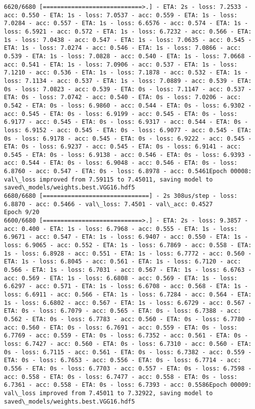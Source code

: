 \documentclass[11pt]{article}
\begin{document}
\begin{Verbatim}[commandchars=\\\{\}]
6620/6680 [============================>.] - ETA: 2s - loss: 7.2533 - acc: 0.550 - ETA: 1s - loss: 7.0537 - acc: 0.559 - ETA: 1s - loss: 7.0284 - acc: 0.557 - ETA: 1s - loss: 6.6576 - acc: 0.574 - ETA: 1s - loss: 6.5921 - acc: 0.572 - ETA: 1s - loss: 6.7232 - acc: 0.566 - ETA: 1s - loss: 7.0438 - acc: 0.547 - ETA: 1s - loss: 7.0635 - acc: 0.545 - ETA: 1s - loss: 7.0274 - acc: 0.546 - ETA: 1s - loss: 7.0866 - acc: 0.539 - ETA: 1s - loss: 7.0828 - acc: 0.540 - ETA: 1s - loss: 7.0668 - acc: 0.541 - ETA: 1s - loss: 7.0906 - acc: 0.537 - ETA: 1s - loss: 7.1210 - acc: 0.536 - ETA: 1s - loss: 7.1878 - acc: 0.532 - ETA: 1s - loss: 7.1134 - acc: 0.537 - ETA: 1s - loss: 7.0889 - acc: 0.539 - ETA: 0s - loss: 7.0823 - acc: 0.539 - ETA: 0s - loss: 7.1147 - acc: 0.537 - ETA: 0s - loss: 7.0742 - acc: 0.540 - ETA: 0s - loss: 7.0206 - acc: 0.542 - ETA: 0s - loss: 6.9860 - acc: 0.544 - ETA: 0s - loss: 6.9302 - acc: 0.545 - ETA: 0s - loss: 6.9199 - acc: 0.545 - ETA: 0s - loss: 6.9177 - acc: 0.545 - ETA: 0s - loss: 6.9317 - acc: 0.544 - ETA: 0s - loss: 6.9152 - acc: 0.545 - ETA: 0s - loss: 6.9077 - acc: 0.545 - ETA: 0s - loss: 6.9178 - acc: 0.545 - ETA: 0s - loss: 6.9222 - acc: 0.545 - ETA: 0s - loss: 6.9237 - acc: 0.545 - ETA: 0s - loss: 6.9141 - acc: 0.545 - ETA: 0s - loss: 6.9138 - acc: 0.546 - ETA: 0s - loss: 6.9393 - acc: 0.544 - ETA: 0s - loss: 6.9048 - acc: 0.546 - ETA: 0s - loss: 6.8760 - acc: 0.547 - ETA: 0s - loss: 6.8978 - acc: 0.5461Epoch 00008: val\_loss improved from 7.59115 to 7.45011, saving model to saved\_models/weights.best.VGG16.hdf5
6680/6680 [==============================] - 2s 308us/step - loss: 6.8870 - acc: 0.5466 - val\_loss: 7.4501 - val\_acc: 0.4527
Epoch 9/20
6600/6680 [============================>.] - ETA: 2s - loss: 9.3857 - acc: 0.400 - ETA: 1s - loss: 6.7968 - acc: 0.555 - ETA: 1s - loss: 6.9671 - acc: 0.547 - ETA: 1s - loss: 6.9407 - acc: 0.550 - ETA: 1s - loss: 6.9065 - acc: 0.552 - ETA: 1s - loss: 6.7869 - acc: 0.558 - ETA: 1s - loss: 6.8928 - acc: 0.551 - ETA: 1s - loss: 6.7772 - acc: 0.560 - ETA: 1s - loss: 6.8045 - acc: 0.561 - ETA: 1s - loss: 6.7120 - acc: 0.566 - ETA: 1s - loss: 6.7031 - acc: 0.567 - ETA: 1s - loss: 6.6763 - acc: 0.569 - ETA: 1s - loss: 6.6808 - acc: 0.569 - ETA: 1s - loss: 6.6297 - acc: 0.571 - ETA: 1s - loss: 6.6708 - acc: 0.568 - ETA: 1s - loss: 6.6911 - acc: 0.566 - ETA: 1s - loss: 6.7284 - acc: 0.564 - ETA: 1s - loss: 6.6802 - acc: 0.567 - ETA: 1s - loss: 6.6729 - acc: 0.567 - ETA: 0s - loss: 6.7079 - acc: 0.565 - ETA: 0s - loss: 6.7388 - acc: 0.562 - ETA: 0s - loss: 6.7783 - acc: 0.560 - ETA: 0s - loss: 6.7780 - acc: 0.560 - ETA: 0s - loss: 6.7691 - acc: 0.559 - ETA: 0s - loss: 6.7769 - acc: 0.559 - ETA: 0s - loss: 6.7352 - acc: 0.561 - ETA: 0s - loss: 6.7427 - acc: 0.560 - ETA: 0s - loss: 6.7310 - acc: 0.560 - ETA: 0s - loss: 6.7115 - acc: 0.561 - ETA: 0s - loss: 6.7382 - acc: 0.559 - ETA: 0s - loss: 6.7653 - acc: 0.556 - ETA: 0s - loss: 6.7714 - acc: 0.556 - ETA: 0s - loss: 6.7703 - acc: 0.557 - ETA: 0s - loss: 6.7598 - acc: 0.558 - ETA: 0s - loss: 6.7477 - acc: 0.558 - ETA: 0s - loss: 6.7361 - acc: 0.558 - ETA: 0s - loss: 6.7393 - acc: 0.5586Epoch 00009: val\_loss improved from 7.45011 to 7.32922, saving model to saved\_models/weights.best.VGG16.hdf5

\end{Verbatim}
\end{document}
